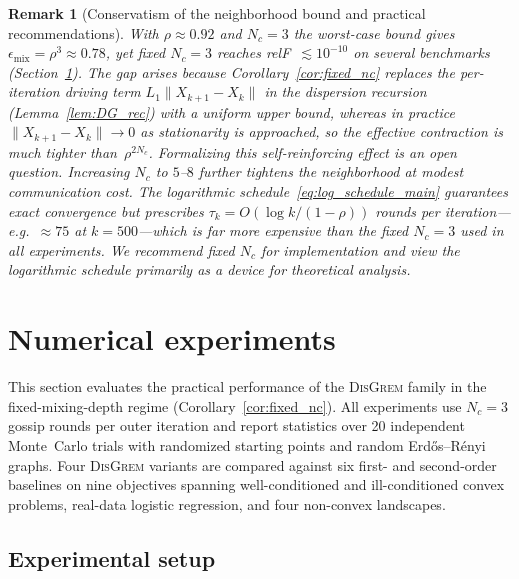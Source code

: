\documentclass[11pt,a4paper]{article}
\def\cO{O}%
\newtheorem{remark}[theorem]{Remark}
\newcommand{\cO}{\mathcal{O}}
\begin{document}
\begin{remark}[Conservatism of the neighborhood bound and practical recommendations]\label{rem:practical_implications}
With $\rho\approx 0.92$ and $N_c=3$ the worst-case bound gives
$\epsilon_{\mathrm{mix}}=\rho^3\approx 0.78$, yet fixed $N_c{=}3$
reaches relF~$\lesssim 10^{-10}$ on several benchmarks
(Section~\ref{sec:experiments}).
The gap arises because Corollary~\ref{cor:fixed_nc} replaces the
per-iteration driving term $L_1\|X_{k+1}{-}X_k\|$ in the
dispersion recursion (Lemma~\ref{lem:DG_rec}) with a \emph{uniform}
upper bound, whereas in practice
$\|X_{k+1}{-}X_k\|\to 0$ as stationarity is approached, so the
effective contraction is much tighter than~$\rho^{2N_c}$.
Formalizing this self-reinforcing effect is an open question.
Increasing $N_c$ to $5$--$8$ further tightens the neighborhood at
modest communication cost.
The logarithmic schedule~\eqref{eq:log_schedule_main} guarantees
exact convergence but prescribes $\tau_k=\cO(\log k/(1{-}\rho))$
rounds per iteration---e.g.\ ${\approx}75$ at $k{=}500$---which is
far more expensive than the fixed $N_c{=}3$ used in all experiments.
We recommend fixed $N_c$ for implementation and view the
logarithmic schedule primarily as a device for theoretical analysis.
\end{remark}




\section{Numerical experiments}\label{sec:experiments}

	This section evaluates the practical performance of the
	\textsc{DisGrem} family in the fixed-mixing-depth regime
	(Corollary~\ref{cor:fixed_nc}).
	All experiments use $N_c=3$ gossip rounds per outer iteration and
	report statistics over 20 independent Monte~Carlo trials with
	randomized starting points and random Erd\H{o}s--R\'{e}nyi graphs.
	Four \textsc{DisGrem} variants are compared against six first- and
	second-order baselines on nine objectives spanning well-conditioned
	and ill-conditioned convex problems, real-data logistic regression,
	and four non-convex landscapes.
	
	\subsection{Experimental setup}\label{ssec:setup}
	
\end{document}
